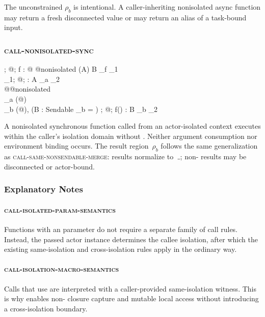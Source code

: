 The unconstrained $\rho_b$ is intentional. A caller-inheriting nonisolated async function may return a fresh disconnected value or may return an alias of a task-bound input.

\subsubsection{\textsc{call-nonisolated-sync}}

  {\Gamma;\; @\kappa;\; \alpha \vdash f : @\sigma\; @\textsf{nonisolated}\; (A) \to B \at \rho_f \dashv \Gamma_1 \\
   \Gamma_1;\; @\kappa;\; \alpha \vdash {} : A \at \rho_a \dashv \Gamma_2 \\
   @\kappa \neq @\textsf{nonisolated} \\
   \rho_a \in \Accessible(@\kappa) \\
   \rho_b \in \Accessible(@\kappa),\; (B : \textsf{Sendable} \Rightarrow \rho_b = \mathunderscore)}
  {\Gamma;\; @\kappa;\; \alpha \vdash f() : B \at \rho_b \dashv \Gamma_2}

A nonisolated synchronous function called from an actor-isolated context executes within the caller's isolation domain without . Neither argument consumption nor environment binding occurs. The result region~$\rho_b$ follows the same generalization as \textsc{call-same-nonsendable-merge}:  results normalize to~$\mathunderscore$; non- results may be disconnected or actor-bound.

\subsubsection{Explanatory Notes}

\paragraph{\textsc{call-isolated-param-semantics}}
Functions with an  parameter do not require a separate family of call rules. Instead, the passed actor instance determines the callee isolation, after which the existing same-isolation and cross-isolation rules apply in the ordinary way.

\paragraph{\textsc{call-isolation-macro-semantics}}
Calls that use  are interpreted with a caller-provided same-isolation witness. This is why  enables non- closure capture and mutable local access without introducing a cross-isolation boundary.

